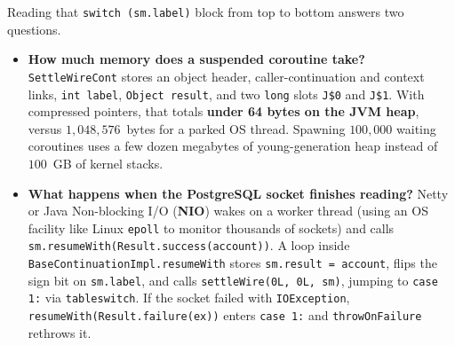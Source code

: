 Reading that \texttt{switch (sm.label)} block from top to bottom answers two questions.
\begin{itemize}
  \item \textbf{How much memory does a suspended coroutine take?} \texttt{SettleWireCont} stores an object header, caller-continuation and context links, \texttt{int label}, \texttt{Object result}, and two \texttt{long} slots \texttt{J\$0} and \texttt{J\$1}. With compressed pointers, that totals \textbf{under 64 bytes on the JVM heap}, versus $1{,}048{,}576$~bytes for a parked OS thread. Spawning $100{,}000$ waiting coroutines uses a few dozen megabytes of young-generation heap instead of $100$~GB of kernel stacks.
  \item \textbf{What happens when the PostgreSQL socket finishes reading?} Netty or Java Non-blocking I/O (\textbf{NIO}) wakes on a worker thread (using an OS facility like Linux \texttt{epoll} to monitor thousands of sockets) and calls \texttt{sm.resumeWith(Result.success(account))}. A loop inside \texttt{BaseContinuationImpl.resumeWith} stores \texttt{sm.result = account}, flips the sign bit on \texttt{sm.label}, and calls \texttt{settleWire(0L, 0L, sm)}, jumping to \texttt{case 1:} via \texttt{tableswitch}. If the socket failed with \texttt{IOException}, \texttt{resumeWith(Result.failure(ex))} enters \texttt{case 1:} and \texttt{throwOnFailure} rethrows it.
\end{itemize}


